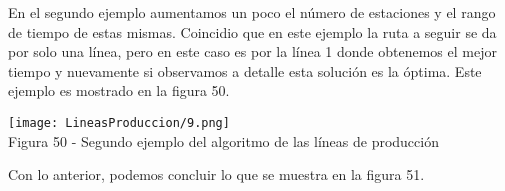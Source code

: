 \documentclass[12pt,twoside]{article}
\begin{document}
En el segundo ejemplo aumentamos un poco el número de estaciones y el rango de tiempo de estas mismas. Coincidio que en este ejemplo la ruta a seguir se da por solo una línea, pero en este caso es por la línea 1 donde obtenemos el mejor tiempo y nuevamente si observamos a detalle esta solución es la óptima. Este ejemplo es mostrado en la figura 50.
\begin{center}
    \texttt{[image: LineasProduccion/9.png]}\\
    Figura 50 - Segundo ejemplo del algoritmo de las líneas de producción
\end{center}
Con lo anterior, podemos concluir lo que se muestra en la figura 51.
\begin{center}



\begin{tikzpicture}[x=0.75pt,y=0.75pt,yscale=-1,xscale=1]


\end{tikzpicture}
\end{center}
\end{document}
